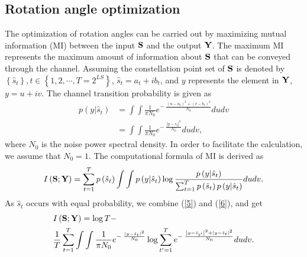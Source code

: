 \documentclass[conference]{IEEEtran}
\begin{document}
\subsection{Rotation angle optimization}
The optimization of rotation angles can be carried out by maximizing mutual information (MI) between the input ${\bf{S}}$ and the output ${\bf{Y}}$. The maximum MI represents the maximum amount of information about ${\bf{S}}$ that can be conveyed through the channel. Assuming the constellation point set of ${\bf{S}}$ is denoted by $\left\{ {{\hat s_t}} \right\},t \in \left\{ {1,2, \cdots ,T = {2^{LS}}} \right\}$, ${\hat s_t} = {a_t} + i{b_t}$, and $y$ represents the element in ${\bf{Y}}$, $y = u + iv$. The channel transition probability is given as
\begin{equation}
\begin{aligned}
p(y|{\hat s_t}) &= \int\int{\frac{1}{{\pi {N_0}}}{e^{ - \;\frac{{{{\left( {u - {a_t}} \right)}^2} + {{\left( {v - {b_t}} \right)}^2}}}{{{N_0}}}}}dudv} \\
&= \int\int\frac{1}{{\pi {N_0}}}{e^{ - \;\frac{{{{\left| {y - {\hat s_t}} \right|}^2}}}{{{N_0}}}}}dudv\label{5},
\end{aligned}
\end{equation}
where $N_0$ is the noise power spectral density. In order to facilitate the calculation, we assume that $N_0=1$. The computational formula of MI is derived as
\begin{equation}
\begin{aligned}
I\left( {\bf{S};\bf{Y}} \right) = \sum\limits_{t = 1}^T {p\left( {{\hat s_t}} \right)} \int \int p\left( {y|{\hat s_t}} \right)\log \frac{{p\left( {y|{\hat s_t}} \right)}}{{\sum\nolimits_{t = 1}^T {p\left( {{\hat s_t}} \right)p\left( {y|{\hat s_t}} \right)} }}dudv\label{6}.
\end{aligned}
\end{equation}
As $\hat s_t$ occurs with equal probability, we combine (\ref{5}) and (\ref{6}), and get
\begin{equation}
\begin{aligned}
&I\left( {\bf{S};\bf{Y}} \right) = \log T - \\
&\frac{1}{T}\sum\limits_{t = 1}^T {\int\int\frac{1}{{\pi {N_0}}}{e^{ - \;\frac{{{{\left| {y - {\hat s_t}} \right|}^2}}}{{{N_0}}}}}\log \sum\limits_{t' = 1}^T {{e^{ - \;\frac{{{{\left| {y - {\hat s_{t'}}} \right|}^2} + {{\left| {y - {\hat s_t}} \right|}^2}}}{{{N_0}}}}}} dudv}\label{7}.
\end{aligned}
\end{equation}
\end{document}

